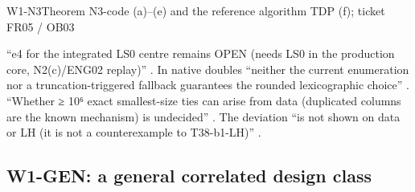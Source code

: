 \begin{card}{W1-N3}{Theorem N3-code (a)–(e) and the reference algorithm TDP (f); ticket FR05 / OB03}
\begin{notproved}
``e4 for the integrated LS0 centre remains OPEN (needs LS0 in the production core, N2(c)/ENG02 replay)'' . In native doubles ``neither the current enumeration nor a truncation-triggered fallback guarantees the rounded lexicographic choice'' . ``Whether ≥ 10⁶ exact smallest-size ties can arise from data (duplicated columns are the known mechanism) is undecided'' . The deviation ``is not shown on data or LH (it is not a counterexample to T38-b1-LH)'' .
\end{notproved}
\end{card}

\subsection{W1-GEN: a general correlated design class}\label{sec:loop:gen}
